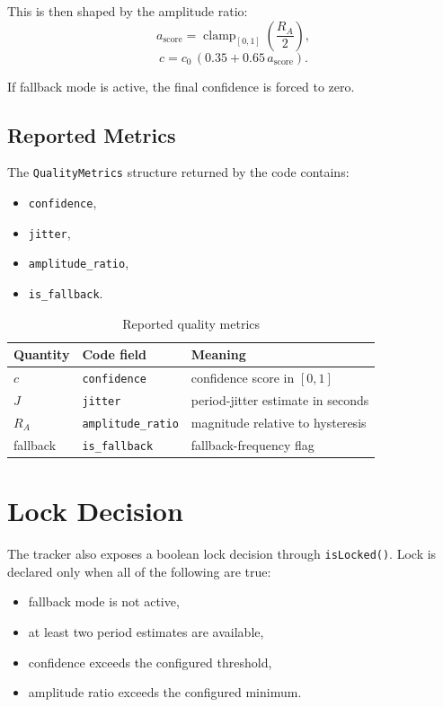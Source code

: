 \documentclass[conference]{IEEEtran}
\begin{document}
This is then shaped by the amplitude ratio:
\begin{equation}
  a_{\mathrm{score}}
  =
  \operatorname{clamp}_{[0,1]}\!\left(\frac{R_A}{2}\right),
\end{equation}
\begin{equation}
  c = c_0\,(0.35 + 0.65\,a_{\mathrm{score}}).
\end{equation}

If fallback mode is active, the final confidence is forced to zero.

\subsection{Reported Metrics}

The \texttt{QualityMetrics} structure returned by the code contains:
\begin{itemize}[leftmargin=1.4em]
  \item \texttt{confidence},
  \item \texttt{jitter},
  \item \texttt{amplitude\_ratio},
  \item \texttt{is\_fallback}.
\end{itemize}

\begin{table}[t]
  \centering
  \caption{Reported quality metrics}
  \label{tab:quality}
  \small
  \begin{tabular}{@{}lll@{}}
    \toprule
    Quantity & Code field & Meaning \\
    \midrule
    \(c\) & \texttt{confidence} & confidence score in \([0,1]\) \\
    \(J\) & \texttt{jitter} & period-jitter estimate in seconds \\
    \(R_A\) & \texttt{amplitude\_ratio} & magnitude relative to hysteresis \\
    fallback & \texttt{is\_fallback} & fallback-frequency flag \\
    \bottomrule
  \end{tabular}
\end{table}

\section{Lock Decision}

The tracker also exposes a boolean lock decision through \texttt{isLocked()}.
Lock is declared only when all of the following are true:
\begin{itemize}[leftmargin=1.4em]
  \item fallback mode is not active,
  \item at least two period estimates are available,
  \item confidence exceeds the configured threshold,
  \item amplitude ratio exceeds the configured minimum.
\end{itemize}
\end{document}
